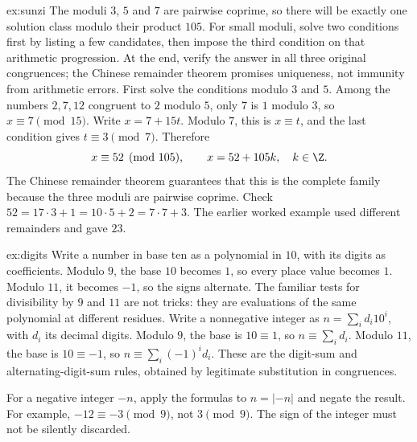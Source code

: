 \begin{solution}{ex:sunzi}
\idea The moduli $3$, $5$ and $7$ are pairwise coprime, so there will be exactly one solution class modulo their product $105$. For small moduli, solve two conditions first by listing a few candidates, then impose the third condition on that arithmetic progression. At the end, verify the answer in all three original congruences; the Chinese remainder theorem promises uniqueness, not immunity from arithmetic errors.
\writeup First solve the conditions modulo $3$ and $5$. Among the numbers $2,7,12$ congruent to $2$ modulo $5$, only $7$ is $1$ modulo $3$, so $x\equiv7\pmod{15}$. Write $x=7+15t$. Modulo $7$, this is $x\equiv t$, and the last condition gives $t\equiv3\pmod7$. Therefore
\[
x\equiv52\pmod{105},\qquad x=52+105k,\quad k\in\Z.
\]
The Chinese remainder theorem guarantees that this is the complete family because the three moduli are pairwise coprime. Check $52=17\cdot3+1=10\cdot5+2=7\cdot7+3$. The earlier worked example used different remainders and gave $23$.
\end{solution}

\begin{solution}{ex:digits}
\idea Write a number in base ten as a polynomial in $10$, with its digits as coefficients. Modulo $9$, the base $10$ becomes $1$, so every place value becomes $1$. Modulo $11$, it becomes $-1$, so the signs alternate. The familiar tests for divisibility by $9$ and $11$ are not tricks: they are evaluations of the same polynomial at different residues.
\writeup Write a nonnegative integer as $n=\sum_i d_i10^i$, with $d_i$ its decimal digits. Modulo $9$, the base is $10\equiv1$, so $n\equiv\sum_i d_i$. Modulo $11$, the base is $10\equiv-1$, so $n\equiv\sum_i(-1)^id_i$. These are the digit-sum and alternating-digit-sum rules, obtained by legitimate substitution in congruences.

For a negative integer $-n$, apply the formulas to $n=|-n|$ and negate the result. For example, $-12\equiv-3\pmod9$, not $3\pmod9$. The sign of the integer must not be silently discarded.
\end{solution}

